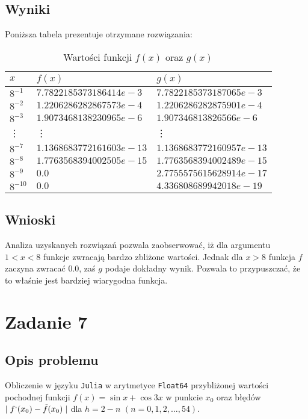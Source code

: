 \documentclass{classrep}
\begin{document}
	\subsection{Wyniki}
		Poniższa tabela prezentuje otrzymane rozwiązania:
		\begin{table}[h!]
        	\centering
        	\footnotesize
			\begin{tabular}{lll} \toprule
				$x$ & $f(x)$ & $g(x)$ \\ \midrule
				$8^{-1}$ & $7.7822185373186414e-3$ & $7.7822185373187065e-3$ \\ 
 				$8^{-2}$ & $1.2206286282867573e-4$ & $1.2206286282875901e-4$ \\
 				$8^{-3}$ & $1.9073468138230965e-6$ & $1.907346813826566e-6$ \\
 				\vdots & \vdots & \vdots \\
 				$8^{-7}$ & $1.1368683772161603e-13$ & $1.1368683772160957e-13$ \\
 				$8^{-8}$ & $1.7763568394002505e-15$ & $1.7763568394002489e-15$ \\
 				$8^{-9}$ & $0.0$ & $2.7755575615628914e-17$ \\
 				$8^{-10}$ & $0.0$ & $4.336808689942018e-19$ \\\bottomrule
 			\end{tabular}
 			\caption{Wartości funkcji $f(x)$ oraz $g(x)$}
			\label{table:10}
		\end{table}
	
	\subsection{Wnioski}
		Analiza uzyskanych rozwiązań pozwala zaobserwować, iż dla argumentu $1<x<8$ funkcje zwracają bardzo 
		zbliżone wartości. Jednak dla $x>8$ funkcja $f$ zaczyna zwracać $0.0$, zaś $g$ podaje dokładny wynik. 
		Pozwala to przypuszczać, że to właśnie jest bardziej wiarygodna funkcja.
\section{Zadanie 7}
	\subsection{Opis problemu}
		Obliczenie w języku \texttt{Julia} w arytmetyce \texttt{Float64} przybliżonej wartości pochodnej funkcji
		$f(x)=\sin{x}+\cos{3x}$ w punkcie $x_0$ oraz błędów $\mid f`(x_0)-\tilde{f}(x_0) \mid$ dla 
		$h=2-n$ $(n=0,1,2,\dots,54)$.
\end{document}
